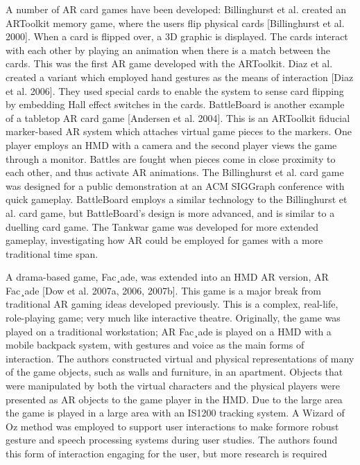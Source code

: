 A number of AR card games have been developed: Billinghurst et al. created an ARToolkit memory game, where the users flip physical cards [Billinghurst et al. 2000]. When a card is flipped over, a 3D graphic is displayed. The cards interact with each other by playing an animation when there is a match between the cards. This was the first AR game developed with the ARToolkit. Diaz et al. created a variant which employed hand gestures as the means of interaction [Diaz et al. 2006]. They used special cards to enable the system to sense card flipping by embedding Hall effect switches in the cards. BattleBoard is another example of a tabletop AR card game [Andersen et al. 2004]. This is an ARToolkit fiducial marker-based AR system which attaches virtual game pieces to the markers. One player employs an HMD with a camera and the second player views the game through a monitor. Battles are fought when pieces come in close proximity to each other, and thus activate AR animations. The Billinghurst et al. card game was designed for a public demonstration at an ACM SIGGraph conference with quick gameplay. BattleBoard employs a similar technology to the Billinghurst et al. card game, but BattleBoard’s design is more advanced, and is similar to a duelling card game. The Tankwar game was developed for more extended gameplay, investigating how AR could be employed for games with a more traditional time span.


A drama-based game, Fac¸ade, was extended into an HMD AR version, AR Fac¸ade [Dow et al. 2007a, 2006, 2007b]. This game is a major break from traditional AR gaming ideas developed previously. This is a complex, real-life, role-playing game; very much like interactive theatre. Originally, the game was played on a traditional workstation; AR Fac¸ade is played on a HMD with a mobile backpack system, with gestures and voice as the main forms of interaction. The authors constructed virtual and physical representations of many of the game objects, such as walls and furniture, in an apartment. Objects that were manipulated by both the virtual characters and the physical players were presented as AR objects to the game player in the HMD. Due to the large area the game is played in a large area with an IS1200 tracking system. A Wizard of Oz method was employed to support user interactions to make formore robust gesture and speech processing systems during user studies. The authors found this form of interaction engaging for the user, but more research is required


